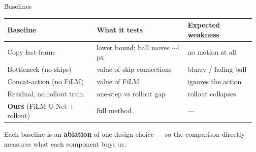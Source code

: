 \documentclass[aspectratio=169]{beamer}
\begin{document}
\begin{frame}{Baselines}
  \centering
  \renewcommand{\arraystretch}{1.3}
  \begin{tabular}{lll}
    \toprule
    \textbf{Baseline} & \textbf{What it tests} & \textbf{Expected weakness} \\
    \midrule
    Copy-last-frame & lower bound; ball moves $\sim$1 px & no motion at all \\
    Bottleneck (no skips) & value of skip connections & blurry / fading ball \\
    Concat-action (no FiLM) & value of FiLM & ignores the action \\
    Residual, no rollout train & one-step vs rollout gap & rollout collapses \\
    \midrule
    \textbf{Ours} (FiLM U-Net + rollout) & full method & --- \\
    \bottomrule
  \end{tabular}

  \vspace{0.8em}
  \footnotesize
  Each baseline is an \textbf{ablation} of one design choice --- so the comparison
  directly measures what each component buys us.
\end{frame}
\end{document}
